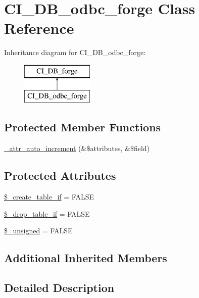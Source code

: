 \hypertarget{class_c_i___d_b__odbc__forge}{}\section{C\+I\+\_\+\+D\+B\+\_\+odbc\+\_\+forge Class Reference}
\label{class_c_i___d_b__odbc__forge}
Inheritance diagram for C\+I\+\_\+\+D\+B\+\_\+odbc\+\_\+forge\+:\begin{figure}[H]
\begin{center}
\leavevmode
\includegraphics[height=2.000000cm]{class_c_i___d_b__odbc__forge}
\end{center}
\end{figure}
\subsection*{Protected Member Functions}
\begin{DoxyCompactItemize}
\item 
\mbox{\hyperlink{class_c_i___d_b__odbc__forge_a2a013a5932439c3c44f0dad3436525f7}{\+\_\+attr\+\_\+auto\+\_\+increment}} (\&\$attributes, \&\$field)
\end{DoxyCompactItemize}
\subsection*{Protected Attributes}
\begin{DoxyCompactItemize}
\item 
\mbox{\hyperlink{class_c_i___d_b__odbc__forge_a2f6484fcb8d1dc3eef67a637227cd583}{\$\+\_\+create\+\_\+table\+\_\+if}} = F\+A\+L\+SE
\item 
\mbox{\hyperlink{class_c_i___d_b__odbc__forge_a92a8a9145a7fc91e252e58d019373581}{\$\+\_\+drop\+\_\+table\+\_\+if}} = F\+A\+L\+SE
\item 
\mbox{\hyperlink{class_c_i___d_b__odbc__forge_aae977ae6d61fa183f0b25422b6ddc31c}{\$\+\_\+unsigned}} = F\+A\+L\+SE
\end{DoxyCompactItemize}
\subsection*{Additional Inherited Members}


\subsection{Detailed Description}


